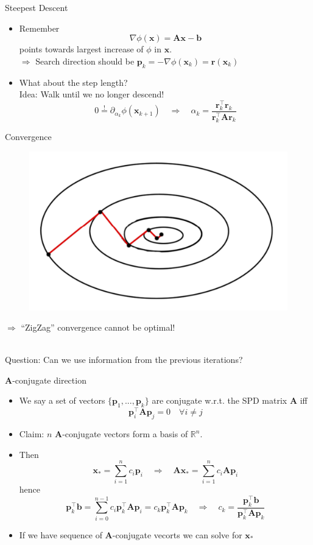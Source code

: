 \documentclass{beamer}
\newcommand{\bvec}[1]{\mathbf{#1}}
\newcommand{\vb}{\bvec{b}}
\newcommand{\vp}{\bvec{p}}
\newcommand{\vr}{\bvec{r}}
\newcommand{\vx}{\bvec{x}}
\newcommand{\vA}{\bvec{A}}
\newcommand{\bitem}{\item[$\bullet$]}
\begin{document}
\begin{frame}{Steepest Descent}

\begin{itemize}
    \bitem Remember
    $$
    \nabla \phi (\vx)
    =
    \vA\vx - \vb
    $$
    points towards largest increase of $\phi$ in $\vx$.\\
    $\Rightarrow$ Search direction should be $\vp_k = - \nabla \phi (\vx_k) = \vr(\vx_k)$
    \bitem What about the step length?\\
    Idea: Walk until we no longer descend!
    $$
    0 \overset{!}{=} \partial_{\alpha_k} \phi(\vx_{k+1})
    \quad \Rightarrow \quad 
    \alpha_k
    =
    \frac{\vr_k^\top \vr_k}{\vr_k^\top \vA \vr_k}
    $$
\end{itemize}
    
\end{frame}

\begin{frame}{Convergence}

\begin{figure}
    \centering
    \includegraphics[width = .5\textwidth]{Graphics/StepestDescendConv.png}
\end{figure}

\begin{center}
$\Rightarrow$ ``ZigZag'' convergence cannot be optimal!
\end{center}
~\\
Question: Can we use information from the previous iterations?
\end{frame}


\begin{frame}{$\vA$-conjugate direction}

\begin{itemize}
    \bitem We say a set of vectors $\{\vp_1,...,\vp_{k}\}$ are conjugate w.r.t. the SPD matrix $\vA$ iff
    $$
    \vp_i^\top \vA \vp_j = 0 \quad \forall i \neq j 
    $$
    \bitem Claim: $n$ $\vA$-conjugate vectors form a basis of $\mathbb{R}^n$.
    \bitem Then
    $$
    \vx_*
    =
    \sum_{i=1}^{n} c_i\vp_i 
    \quad \Rightarrow \quad
    \vA\vx_*
    = \sum_{i=1}^{n} c_i \vA \vp_i 
    $$
    hence
    $$
    \vp_k^\top\vb
    =
    \sum_{i=0}^{n-1} c_i \vp_k^\top \vA \vp_i
    =
    c_k \vp_k^\top \vA \vp_k
    \quad \Rightarrow \quad
    c_k = \frac{\vp_k^\top\vb}{\vp_k^\top \vA \vp_k}
    $$
    \bitem If we have sequence of $\vA$-conjugate vecorts we can solve for $\vx_*$
\end{itemize}
    
\end{frame}
\end{document}
